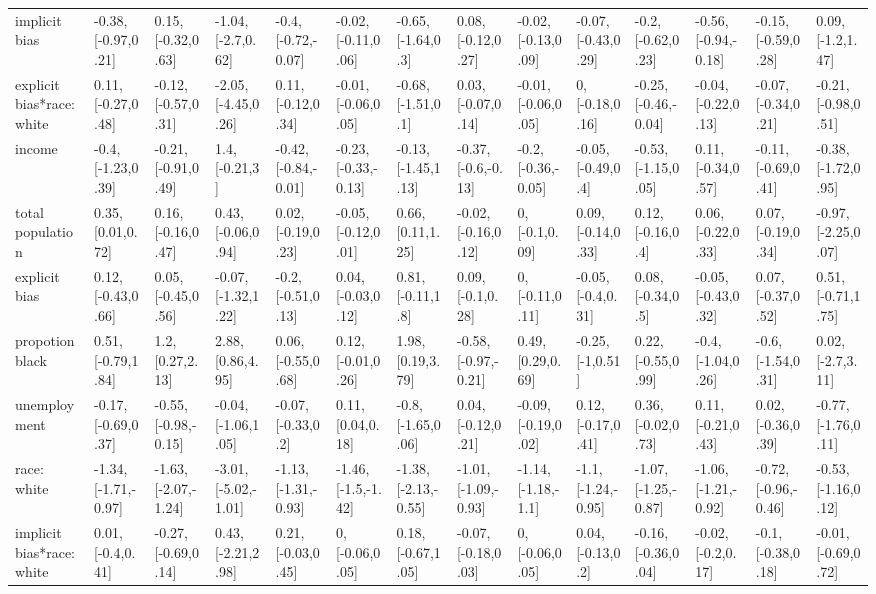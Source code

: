 \documentclass[english,floatsintext,man]{apa6}
\newenvironment{lltable}
  {\begin{landscape}\begin{center}\begin{ThreePartTable}}
  {\end{ThreePartTable}\end{center}\end{landscape}}
\theoremstyle{definition}
\theoremstyle{definition}
\theoremstyle{remark}
\begin{document}
\begin{lltable}
{\begin{longtable}{llllllllllllll}
implicit bias & -0.38, [-0.97,0.21] & 0.15, [-0.32,0.63] & -1.04, [-2.7,0.62] & -0.4, [-0.72,-0.07] & -0.02, [-0.11,0.06] & -0.65, [-1.64,0.3] & 0.08, [-0.12,0.27] & -0.02, [-0.13,0.09] & -0.07, [-0.43,0.29] & -0.2, [-0.62,0.23] & -0.56, [-0.94,-0.18] & -0.15, [-0.59,0.28] & 0.09, [-1.2,1.47]\\
explicit bias*race: white & 0.11, [-0.27,0.48] & -0.12, [-0.57,0.31] & -2.05, [-4.45,0.26] & 0.11, [-0.12,0.34] & -0.01, [-0.06,0.05] & -0.68, [-1.51,0.1] & 0.03, [-0.07,0.14] & -0.01, [-0.06,0.05] & 0, [-0.18,0.16] & -0.25, [-0.46,-0.04] & -0.04, [-0.22,0.13] & -0.07, [-0.34,0.21] & -0.21, [-0.98,0.51]\\
income & -0.4, [-1.23,0.39] & -0.21, [-0.91,0.49] & 1.4, [-0.21,3] & -0.42, [-0.84,-0.01] & -0.23, [-0.33,-0.13] & -0.13, [-1.45,1.13] & -0.37, [-0.6,-0.13] & -0.2, [-0.36,-0.05] & -0.05, [-0.49,0.4] & -0.53, [-1.15,0.05] & 0.11, [-0.34,0.57] & -0.11, [-0.69,0.41] & -0.38, [-1.72,0.95]\\
total population & 0.35, [0.01,0.72] & 0.16, [-0.16,0.47] & 0.43, [-0.06,0.94] & 0.02, [-0.19,0.23] & -0.05, [-0.12,0.01] & 0.66, [0.11,1.25] & -0.02, [-0.16,0.12] & 0, [-0.1,0.09] & 0.09, [-0.14,0.33] & 0.12, [-0.16,0.4] & 0.06, [-0.22,0.33] & 0.07, [-0.19,0.34] & -0.97, [-2.25,0.07]\\
explicit bias & 0.12, [-0.43,0.66] & 0.05, [-0.45,0.56] & -0.07, [-1.32,1.22] & -0.2, [-0.51,0.13] & 0.04, [-0.03,0.12] & 0.81, [-0.11,1.8] & 0.09, [-0.1,0.28] & 0, [-0.11,0.11] & -0.05, [-0.4,0.31] & 0.08, [-0.34,0.5] & -0.05, [-0.43,0.32] & 0.07, [-0.37,0.52] & 0.51, [-0.71,1.75]\\
propotion black & 0.51, [-0.79,1.84] & 1.2, [0.27,2.13] & 2.88, [0.86,4.95] & 0.06, [-0.55,0.68] & 0.12, [-0.01,0.26] & 1.98, [0.19,3.79] & -0.58, [-0.97,-0.21] & 0.49, [0.29,0.69] & -0.25, [-1,0.51] & 0.22, [-0.55,0.99] & -0.4, [-1.04,0.26] & -0.6, [-1.54,0.31] & 0.02, [-2.7,3.11]\\
unemployment & -0.17, [-0.69,0.37] & -0.55, [-0.98,-0.15] & -0.04, [-1.06,1.05] & -0.07, [-0.33,0.2] & 0.11, [0.04,0.18] & -0.8, [-1.65,0.06] & 0.04, [-0.12,0.21] & -0.09, [-0.19,0.02] & 0.12, [-0.17,0.41] & 0.36, [-0.02,0.73] & 0.11, [-0.21,0.43] & 0.02, [-0.36,0.39] & -0.77, [-1.76,0.11]\\
race: white & -1.34, [-1.71,-0.97] & -1.63, [-2.07,-1.24] & -3.01, [-5.02,-1.01] & -1.13, [-1.31,-0.93] & -1.46, [-1.5,-1.42] & -1.38, [-2.13,-0.55] & -1.01, [-1.09,-0.93] & -1.14, [-1.18,-1.1] & -1.1, [-1.24,-0.95] & -1.07, [-1.25,-0.87] & -1.06, [-1.21,-0.92] & -0.72, [-0.96,-0.46] & -0.53, [-1.16,0.12]\\
implicit bias*race: white & 0.01, [-0.4,0.41] & -0.27, [-0.69,0.14] & 0.43, [-2.21,2.98] & 0.21, [-0.03,0.45] & 0, [-0.06,0.05] & 0.18, [-0.67,1.05] & -0.07, [-0.18,0.03] & 0, [-0.06,0.05] & 0.04, [-0.13,0.2] & -0.16, [-0.36,0.04] & -0.02, [-0.2,0.17] & -0.1, [-0.38,0.18] & -0.01, [-0.69,0.72]\\
\bottomrule
\end{longtable}
}
\end{lltable}
\end{document}
